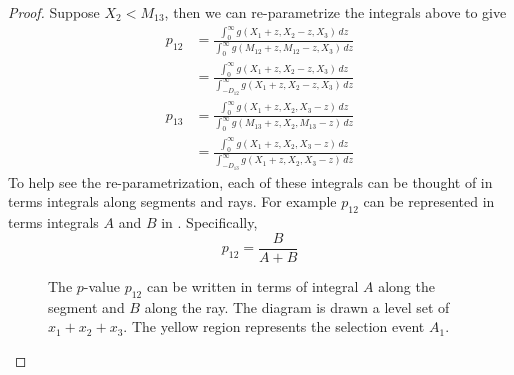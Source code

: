 \documentclass[11pt]{article}
\begin{document}
\begin{proof}
Suppose $X_2 < M_{13}$, then we can re-parametrize the integrals above to give
\begin{align*}
p_{12} & = \frac{\int_0^\infty g\left(X_1 + z, X_2 - z, X_3\right) \,dz}{\int_0^\infty g\left(M_{12} + z, M_{12} - z, X_3\right) \,dz} \\
& = \frac{\int_0^\infty g\left(X_1 + z, X_2 - z, X_3\right) \,dz}{\int_{-D_{12}}^\infty g\left(X_1 + z, X_2 - z, X_3\right) \,dz} \\
p_{13} & = \frac{\int_0^\infty g\left(X_1 + z, X_2, X_3 - z\right) \,dz}{\int_0^\infty g\left(M_{13} + z, X_2, M_{13} - z\right) \,dz} \\
& = \frac{\int_0^\infty g\left(X_1 + z, X_2, X_3 - z\right) \,dz}{\int_{-D_{13}}^\infty g\left(X_1 + z, X_2, X_3 - z\right) \,dz}
\end{align*}
To help see the re-parametrization, each of these integrals can be thought of in terms integrals along segments and rays. For example $p_{12}$ can be represented in terms integrals $A$ and $B$ in . Specifically,
$$p_{12} = \frac{B}{A + B}$$

\begin{figure}[htbp]
\begin{center}
\end{center}
\caption{The $p$-value $p_{12}$ can be written in terms of integral $A$ along the segment and $B$ along the ray. The diagram is drawn a level set of $x_1 + x_2 + x_3$. The yellow region represents the selection event $A_1$.}
\label{fig:p-value}
\end{figure}


\end{proof}
\end{document}
